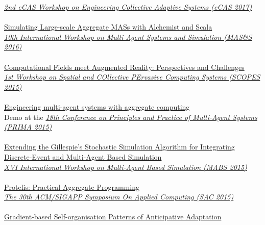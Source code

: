 \href{http://apice.unibo.it/xwiki/bin/view/ECAS2017/WebHome}{\textit{2nd eCAS Workshop on Engineering Collective Adaptive Systems (eCAS 2017)}}
\\ \halfblankline \\
\href{https://www.slideshare.net/DanySK/simulating-largescale-aggregate-mass-with-alchemist-and-scala}{Simulating Large-scale Aggregate MASs with Alchemist and Scala} \\
\href{https://fedcsis.org/2016/mass}{\textit{10th International Workshop on Multi-Agent Systems and Simulation (MAS\&S 2016)}}
\\ \halfblankline \\
\href{https://www.slideshare.net/DanySK/computational-fields-meet-augmented-reality-perspectives-and-challenges}{Computational Fields meet Augmented Reality: Perspectives and Challenges} \\
\href{http://www.spatial-computing.org/scopes}{\textit{1st Workshop on Spatial and COllective PErvasive Computing Systems (SCOPES 2015)}}
\\ \halfblankline \\
\href{http://apice.unibo.it/xwiki/bin/download/PRIMA2015/Demos/Pianini.pdf}{Engineering multi-agent systems with aggregate computing} \\
Demo at the \href{http://apice.unibo.it/xwiki/bin/view/PRIMA2015/Demos}{\textit{18th Conference on Principles and Practice of Multi-Agent Systems (PRIMA 2015)}}
\\ \halfblankline \\
\href{https://www.slideshare.net/DanySK/extending-the-gillespies-stochastic-simulation-algorithm-for-integrating-discreteevent-and-multiagent-based-simulation}{Extending the Gillespie's Stochastic Simulation Algorithm for Integrating Discrete-Event and Multi-Agent Based Simulation} \\
\href{http://www.springer.com/gp/book/9783319314464}{\textit{XVI International Workshop on Multi-Agent Based Simulation (MABS 2015)}}
\\ \halfblankline \\
\href{https://www.slideshare.net/DanySK/sac-47194849}{Protelis: Practical Aggregate Programming} \\
\href{https://www.sigapp.org/sac/sac2015/}{\textit{The 30th ACM/SIGAPP Symposium On Applied Computing (SAC 2015)}}
\\ \halfblankline \\
\href{https://www.slideshare.net/DanySK/gradientbased-selforganisation-patterns-of-anticipative-adaptation}{Gradient-based Self-organisation Patterns of Anticipative Adaptation} \\
